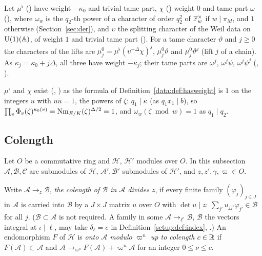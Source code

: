\begin{definition}\label{data:def:liftchar}
Let $\mu^\flat$ () have weight $-\kappa_0$ and trivial tame part, $\chi$
() weight $0$ and tame part $\omega$ (), where
$\omega_w$ is the $q_2$-th power of a character of order $q_2^2$ of $\mathbb{F}_w^\times$ if $w \mid \pi_M$,
and $1$ otherwise (Section~\ref{sec:der}), and $\upsilon$ the splitting character of the Weil data
on $\operatorname{U}(1)(\mathbb{A})$, of weight $1$ and trivial tame part (). For
a tame character $\vartheta$ and $j \ge 0$ the characters of the lifts are
$\mu_j^0 = \mu^\flat(\upsilon^{-\Delta}\chi)^j$, $\mu_j^0\vartheta$ and $\mu_j^0\vartheta^j$ (lift
$j$ of a chain). As $\kappa_j = \kappa_0 + j\Delta$, all three have weight $-\kappa_j$; their
tame parts are $\omega^j$, $\omega^j\psi$, $\omega^j\psi^j$
(, ).
\end{definition}

$\mu^\flat$ and $\chi$ exist (,
) as the formula of
Definition~\ref{data:def:hasweight} is $1$ on the integers $u$ with $u\bar u = 1$, the powers of
$\zeta$: $q_1 \mid \kappa$ (as $q_1x_1 \mid b$), so
$\prod_v\Phi_v(\zeta)^{\kappa_0(v)} = \operatorname{Nm}_{E/K}(\zeta)^{\Delta/2} = 1$, and $\omega_w(\zeta \bmod w) = 1$ as $q_1 \mid q_2$.

\subsection{Colength}

Let $O$ be a commutative ring and $\mathcal{H}$, $\mathcal{H}'$ modules over $O$. In this
subsection $\mathcal{A}, \mathcal{B}, \mathcal{C}$ are submodules of $\mathcal{H}$,
$\mathcal{A}', \mathcal{B}'$ submodules of $\mathcal{H}'$, and $z, z', \gamma, \varpi \in O$.

\begin{definition}\label{data:def:colength}
Write $\mathcal{A} \to_z \mathcal{B}$, \emph{the colength of $\mathcal{B}$ in $\mathcal{A}$ divides
$z$}, if every finite family $(\varphi_j)_{j\in J}$ in $\mathcal{A}$ is carried into $\mathcal{B}$
by a $J\times J$ matrix $u$ over $O$ with $\det u \mid z$: $\sum_{j'} u_{jj'}\varphi_{j'} \in
\mathcal{B}$ for all $j$. ($\mathcal{B} \subset \mathcal{A}$ is not required. A family in some
$\mathcal{A} \to_{\ell^e} \mathcal{B}$, $\mathcal{B}$ the vectors integral at $\iota \mid \ell$, may
take $\delta_\ell = e$ in Definition~\ref{setup:def:index},
.) An endomorphism $F$ of $\mathcal{H}$ is
\emph{onto $\mathcal{A}$ modulo $\varpi^n$ up to colength $c \in \mathbb{R}$} if
$F(\mathcal{A}) \subset \mathcal{A}$ and $\mathcal{A} \to_{\varpi^\nu} F(\mathcal{A}) +
\varpi^n\mathcal{A}$ for an integer $0 \le \nu \le c$.
\end{definition}

